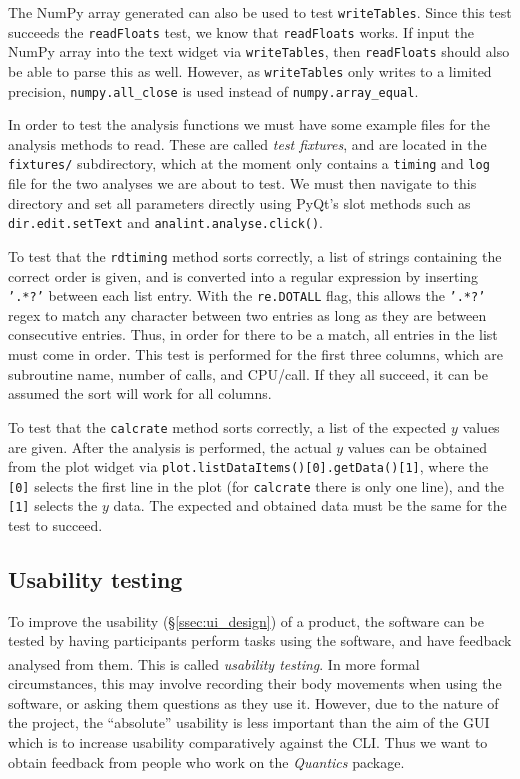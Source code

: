\documentclass[12pt]{article}
\begin{document}
The NumPy array generated can also be used to test \texttt{writeTables}. Since this test succeeds the \texttt{readFloats} test, we know that \texttt{readFloats} works. If input the NumPy array into the text widget via \texttt{writeTables}, then \texttt{readFloats} should also be able to parse this as well. However, as \texttt{writeTables} only writes to a limited precision, \texttt{numpy.all\_close} is used instead of \texttt{numpy.array\_equal}.

In order to test the analysis functions we must have some example files for the analysis methods to read. These are called \textit{test fixtures}, and are located in the \texttt{fixtures/} subdirectory, which at the moment only contains a \texttt{timing} and \texttt{log} file for the two analyses we are about to test. We must then navigate to this directory and set all parameters directly using PyQt's slot methods such as \texttt{dir.edit.setText} and \texttt{analint.analyse.click()}.

To test that the \texttt{rdtiming} method sorts correctly, a list of strings containing the correct order is given, and is converted into a regular expression by inserting \texttt{'.*?'} between each list entry. With the \texttt{re.DOTALL} flag, this allows the \texttt{'.*?'} regex to match any character between two entries as long as they are between consecutive entries. Thus, in order for there to be a match, all entries in the list must come in order. This test is performed for the first three columns, which are subroutine name, number of calls, and CPU/call. If they all succeed, it can be assumed the sort will work for all columns.

To test that the \texttt{calcrate} method sorts correctly, a list of the expected \(y\) values are given. After the analysis is performed, the actual \(y\) values can be obtained from the plot widget via \texttt{plot.listDataItems()[0].getData()[1]}, where the \texttt{[0]} selects the first line in the plot (for \texttt{calcrate} there is only one line), and the \texttt{[1]} selects the \(y\) data. The expected and obtained data must be the same for the test to succeed.

\subsection{Usability testing}\label{ssec:usability}

To improve the usability (\S\ref{ssec:ui_design}) of a product, the software can be tested by having participants perform tasks using the software, and have feedback analysed from them. This is called \textit{usability testing}.\textsuperscript{\cite{usability}} In more formal circumstances, this may involve recording their body movements when using the software, or asking them questions as they use it. However, due to the nature of the project, the ``absolute'' usability is less important than the aim of the GUI which is to increase usability comparatively against the CLI. Thus we want to obtain feedback from people who work on the \textit{Quantics} package.
\end{document}
